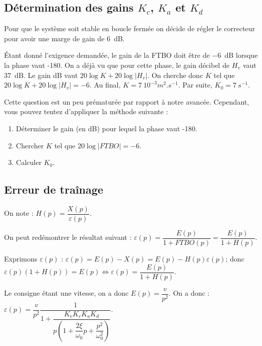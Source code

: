 \else \fi




\subsection*{Détermination des gains $K_c$, $K_a$ et $K_d$}
\ifprof
\else
Pour que le système soit stable en boucle fermée on décide de régler le correcteur pour avoir une marge de gain de \SI{6}{dB}.
\fi

\ifprof
\begin{corrige}
Étant donné l'exigence demandée, le gain de la FTBO doit être de \SI{-6}{dB} lorsque la phase vaut -180\degres.
On a déjà vu que pour cette phase, le gain décibel de $H_v$ vaut \SI{37}{dB}. Le gain dB vaut $20\log K + 20 \log |H_v|$. On cherche donc $K$ tel que $20\log K + 20 \log |H_v|=-6$. Au final, $K=\SI{7}{10^{-3}m^2.s^{-1}}$. Par suite, $K_0=\SI{7}{s^{-1}}$.
\end{corrige}
\else
\fi
\ifprof
\else
\begin{methode}
Cette question est un peu prématurée par rapport à notre avancée. Cependant, vous pouvez tentez d'appliquer la méthode suivante : 
\begin{enumerate}
\item Déterminer le gain (en dB) pour lequel la phase vaut -180\degres.
\item Chercher $K$ tel que $20\log|FTBO|=-6$.
\item Calculer $K_0$.
\end{enumerate}
\end{methode}
\fi

\subsection*{Erreur de traînage}
\ifprof
\else
On note :   $H(p)=\dfrac{X(p)}{\varepsilon(p)}$.
\fi


\ifprof \begin{corrige}
On peut redémontrer le résultat suivant : $\varepsilon(p)=\dfrac{E(p)}{1+FTBO(p)}=\dfrac{E(p)}{1+H(p)}$.

Exprimons $\varepsilon(p)$ : $\varepsilon(p)=E(p)-X(p)=E(p)-H(p)\varepsilon(p)$; donc 
$\varepsilon(p)\left(1+H(p)\right)=E(p)\Longleftrightarrow \varepsilon(p)=\dfrac{E(p)}{1+H(p)}$.

Le consigne étant une vitesse, on a donc $E(p)=\dfrac{v}{p^2}$. On a donc : 
$\varepsilon(p)=\dfrac{v}{p^2}\dfrac{1}{1+\dfrac{K_vK_cK_aK_d}{p\left( 1+\dfrac{2\xi}{\omega_0} p + \dfrac{p^2}{\omega_0^2} \right)}}$.
\end{corrige} \else \fi

